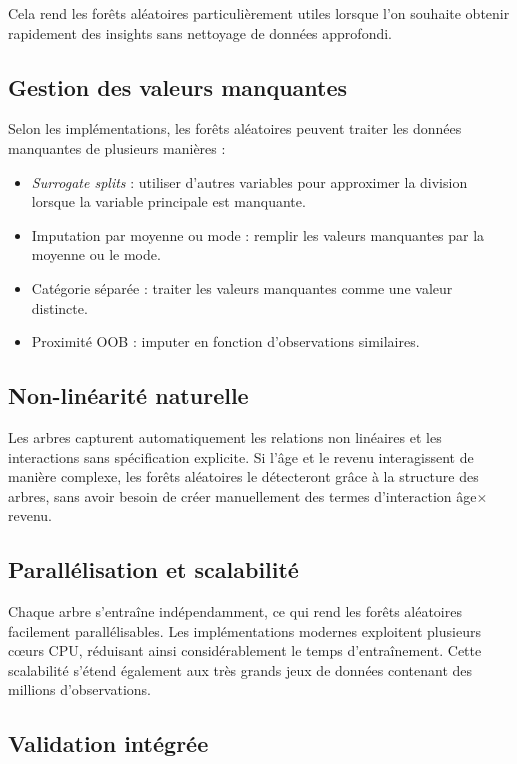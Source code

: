 Cela rend les forêts aléatoires particulièrement utiles lorsque l’on souhaite obtenir rapidement des insights sans nettoyage de données approfondi.

\subsection{ Gestion des valeurs manquantes}

Selon les implémentations, les forêts aléatoires peuvent traiter les données manquantes de plusieurs manières :

\begin{itemize}
    \item \emph{Surrogate splits} : utiliser d’autres variables pour approximer la division lorsque la variable principale est manquante.
    \item Imputation par moyenne ou mode : remplir les valeurs manquantes par la moyenne ou le mode.
    \item Catégorie séparée : traiter les valeurs manquantes comme une valeur distincte.
    \item Proximité OOB : imputer en fonction d’observations similaires.
\end{itemize}

\subsection{ Non-linéarité naturelle}

Les arbres capturent automatiquement les relations non linéaires et les interactions sans spécification explicite. Si l’âge et le revenu interagissent de manière complexe, les forêts aléatoires le détecteront grâce à la structure des arbres, sans avoir besoin de créer manuellement des termes d’interaction âge$\times$revenu.

\subsection{ Parallélisation et scalabilité}

Chaque arbre s’entraîne indépendamment, ce qui rend les forêts aléatoires facilement parallélisables. Les implémentations modernes exploitent plusieurs cœurs CPU, réduisant ainsi considérablement le temps d’entraînement. Cette scalabilité s’étend également aux très grands jeux de données contenant des millions d’observations.

\subsection{ Validation intégrée}

